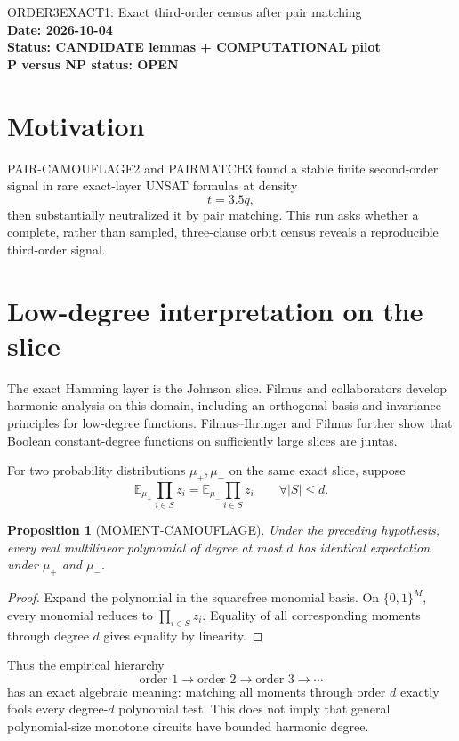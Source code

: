\documentclass[11pt]{article}
\newtheorem{proposition}{Proposition}
\begin{document}
\begin{center}
{\Large ORDER3EXACT1: Exact third-order census after pair matching}\\[4pt]
\textbf{Date: 2026-10-04}\\
\textbf{Status: CANDIDATE lemmas + COMPUTATIONAL pilot}\\
\textbf{P versus NP status: OPEN}
\end{center}

\section{Motivation}
PAIR-CAMOUFLAGE2 and PAIRMATCH3 found a stable finite second-order signal in rare exact-layer UNSAT formulas at density
\[
t=3.5q,
\]
then substantially neutralized it by pair matching.  This run asks whether a complete, rather than sampled, three-clause orbit census reveals a reproducible third-order signal.

\section{Low-degree interpretation on the slice}
The exact Hamming layer is the Johnson slice. Filmus and collaborators develop harmonic analysis on this domain, including an orthogonal basis and invariance principles for low-degree functions. Filmus--Ihringer and Filmus further show that Boolean constant-degree functions on sufficiently large slices are juntas.

For two probability distributions \(\mu_+,\mu_-\) on the same exact slice, suppose
\[
\mathbb E_{\mu_+}\prod_{i\in S}z_i
=
\mathbb E_{\mu_-}\prod_{i\in S}z_i
\qquad
\forall |S|\le d.
\]

\begin{proposition}[MOMENT-CAMOUFLAGE]
Under the preceding hypothesis, every real multilinear polynomial of degree at most \(d\) has identical expectation under \(\mu_+\) and \(\mu_-\).
\end{proposition}
\begin{proof}
Expand the polynomial in the squarefree monomial basis. On \(\{0,1\}^M\), every monomial reduces to \(\prod_{i\in S}z_i\). Equality of all corresponding moments through degree \(d\) gives equality by linearity.
\end{proof}

Thus the empirical hierarchy
\[
\text{order 1}\to\text{order 2}\to\text{order 3}\to\cdots
\]
has an exact algebraic meaning: matching all moments through order \(d\) exactly fools every degree-\(d\) polynomial test. This does not imply that general polynomial-size monotone circuits have bounded harmonic degree.
\end{document}
